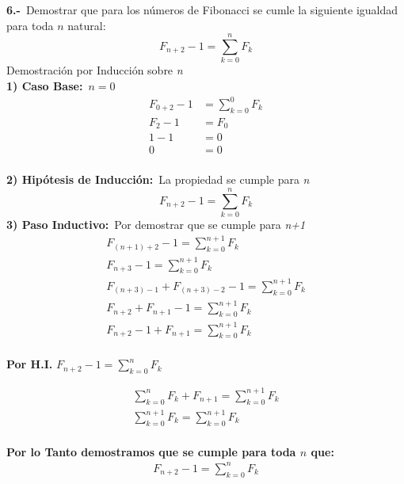 \textbf{6.-}\ Demostrar que para los números de Fibonacci se cumle la siguiente igualdad para toda $n$ natural:
\[
F_{n+2} - 1 = \sum_{k=0}^{n}F_{k}
\]
\newline
Demostración por Inducción sobre \textit{n}\\
\newline
\textbf{1) Caso Base:}\ $n = 0$
\begin{align*}
F_{0+2} - 1 & = \sum_{k=0}^{0}F_{k} \\
F_{2} - 1 & = F_{0} \\
1 - 1 & = 0 \\
0 & = 0 \\
\end{align*}

\textbf{2) Hipótesis de Inducción:}\  La propiedad se cumple para \textit{n}\
\[
F_{n+2} - 1 = \sum_{k=0}^{n}F_{k}
\]
\textbf{3) Paso Inductivo:}\  Por demostrar que se cumple para \textit{n+1}\
\begin{align*}
F_{(n+1)+2} - 1 = \sum_{k=0}^{n+1}F_{k} \\
F_{n+3} - 1 = \sum_{k=0}^{n+1}F_{k} \\
F_{(n+3)-1} + F_{(n+3)-2} - 1 = \sum_{k=0}^{n+1}F_{k} \\
F_{n+2} + F_{n+1} - 1  = \sum_{k=0}^{n+1}F_{k} \\
F_{n+2} - 1 +  F_{n+1}  = \sum_{k=0}^{n+1}F_{k} \\
\end{align*}

\begin{center}
\textbf{Por H.I.} $F_{n+2} - 1  = \sum_{k=0}^{n}F_{k}$
\end{center}

\begin{align*}
\sum_{k=0}^{n}F_{k} +  F_{n+1} = \sum_{k=0}^{n+1}F_{k} \\
\sum_{k=0}^{n+1}F_{k} = \sum_{k=0}^{n+1}F_{k} \\
\end{align*}

\textbf{Por lo Tanto demostramos que se cumple para toda $n$ que:}\\ 
\begin{align*}
F_{n+2} - 1 = \sum_{k=0}^{n}F_{k} 
\end{align*}